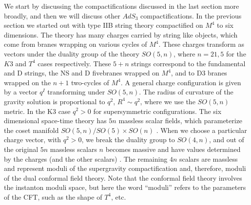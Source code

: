 We  start by discussing the compactifications discussed in
the last section more broadly, and then we will discuss other
$AdS_3$ compactifications.
In the previous section we started out with type IIB string theory
compactified on 
$M^4$ to six dimensions. 
 The theory has many charges carried by string like objects,
which come from branes wrapping on various cycles of $M^4$.
These  charges transform as vectors 
under the duality group of the theory $SO(5,n)$, where 
$n = 21,5 $ for the $K3$ and $T^4$ cases respectively. 
These $5+n$ strings correspond to the fundamental and D strings, 
the NS and D fivebranes wrapped on $M^4$,
 and to D3 branes wrapped on the 
 $n+1$  two-cycles of $M^4$. 
A general charge configuration is given by a vector $q^I$ transforming
under $SO(5,n)$. The radius of curvature  of the gravity 
solution is proportional to $q^2$, $R^4 \sim q^2$,
 where we use the $SO(5,n)$ metric. 
In the K3 case $q^2 >0$ for  supersymmetric configurations. 
The six dimensional space-time theory
has $5n$ massless scalar fields, which parameterize the coset manifold
$SO(5,n)/SO(5)\times SO(n)$ \cite{Romans:1986er}. 
When we choose a particular charge vector, with $q^2 >0$, we break the duality
group to $SO(4,n)$, and out of the original $5n$ massless scalars
$n$ becomes massive and have values determined by the charges (and the
other scalars) \cite{Andrianopoli:1998qg}. 
The remaining 
$4n$ scalars are massless and represent moduli of the supergravity 
compactification
and, therefore, moduli of the dual conformal
field theory. Note that the conformal field theory involves 
the instanton moduli space, but here the word ``moduli'' refers to the
parameters of the CFT, such as the shape of $T^4$, etc. 

